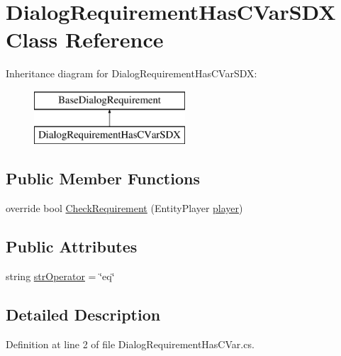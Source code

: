 \hypertarget{class_dialog_requirement_has_c_var_s_d_x}{}\section{Dialog\+Requirement\+Has\+C\+Var\+S\+DX Class Reference}
\label{class_dialog_requirement_has_c_var_s_d_x}
Inheritance diagram for Dialog\+Requirement\+Has\+C\+Var\+S\+DX\+:\begin{figure}[H]
\begin{center}
\leavevmode
\includegraphics[height=2.000000cm]{d8/d82/class_dialog_requirement_has_c_var_s_d_x}
\end{center}
\end{figure}
\subsection*{Public Member Functions}
\begin{DoxyCompactItemize}
\item 
override bool \mbox{\hyperlink{class_dialog_requirement_has_c_var_s_d_x_aeb43ee24f652abc4817d5dbc1b731c1f}{Check\+Requirement}} (Entity\+Player \mbox{\hyperlink{_sphere_i_i_01_music_01_boxes_2_config_2_localization_8txt_a4e2cb8aeff651600ea1cc57fe5a929a4}{player}})
\end{DoxyCompactItemize}
\subsection*{Public Attributes}
\begin{DoxyCompactItemize}
\item 
string \mbox{\hyperlink{class_dialog_requirement_has_c_var_s_d_x_afe5be795d397ed4d4465f226b45f9445}{str\+Operator}} = \char`\"{}eq\char`\"{}
\end{DoxyCompactItemize}


\subsection{Detailed Description}


Definition at line 2 of file Dialog\+Requirement\+Has\+C\+Var.\+cs.



